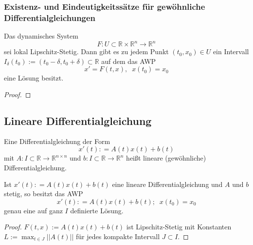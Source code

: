 \subsubsection*{Existenz- und Eindeutigkeitssätze für gewöhnliche Differentialgleichungen} 

\begin{Satz}
Das dynamisches System  $$F : U \subset \mathbb{R} \times \mathbb{R}^n \to \mathbb{R}^n$$ sei lokal Lipschitz-Stetig. 
Dann gibt es zu jedem Punkt $(t_0, x_0) \in U$ ein Intervall $I_\delta (t_0) := (t_0 - \delta, t_0 + \delta) \subset \mathbb{R}$ auf dem das AWP 
$$ x' = F(t,x), \; \; x(t_0) = x_0$$
eine Lösung besitzt.
\end{Satz}
\begin{proof}

\end{proof}


\begin{Lemma}[Gronwall]
\end{Lemma}


\begin{Satz}[Eindeutigkeitssatz]
\end{Satz}


\subsection{Lineare Differentialgleichung}

\begin{Definition}
Eine Differentialgleichung der Form
$$ x' (t): = A(t) x(t) + b(t)$$
mit $A: I \subset \mathbb{R} \to \mathbb{R}^{n \times n}$ und $b: I \subset \mathbb{R} \to \mathbb{R}^{n}$ heißt lineare (gewöhnliche) Differentialgleichung.
\end{Definition}

\begin{Satz}
Ist $ x' (t): = A(t) x(t) + b(t)$ eine lineare Differentialgleichung und $A$ und $b$ stetig, so besitzt das AWP 
$$ x' (t): = A(t) x(t) + b(t) ; \; \; x(t_0) = x_0 $$
genau eine auf ganz $I$ definierte Lösung.
\end{Satz}

\begin{proof}
$F(t,x):= A(t) x(t) + b(t)$ ist Lipschitz-Stetig mit Konstanten $L:= \max_{t \in J}|| A(t) ||$ für jedes kompakte Intervall $J \subset I$.
\end{proof}

